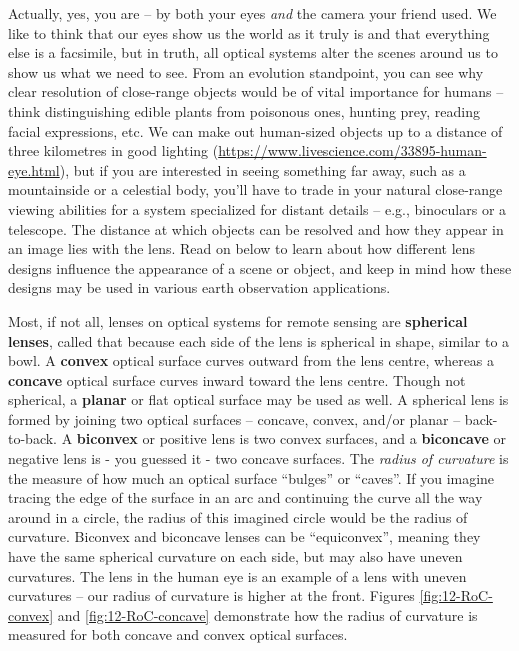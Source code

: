 \documentclass[
]{book}
\begin{document}
Actually, yes, you are -- by both your eyes \emph{and} the camera your friend used. We like to think that our eyes show us the world as it truly is and that everything else is a facsimile, but in truth, all optical systems alter the scenes around us to show us what we need to see. From an evolution standpoint, you can see why clear resolution of close-range objects would be of vital importance for humans -- think distinguishing edible plants from poisonous ones, hunting prey, reading facial expressions, etc. We can make out human-sized objects up to a distance of three kilometres in good lighting (\url{https://www.livescience.com/33895-human-eye.html}), but if you are interested in seeing something far away, such as a mountainside or a celestial body, you'll have to trade in your natural close-range viewing abilities for a system specialized for distant details -- e.g., binoculars or a telescope. The distance at which objects can be resolved and how they appear in an image lies with the lens. Read on below to learn about how different lens designs influence the appearance of a scene or object, and keep in mind how these designs may be used in various earth observation applications.

Most, if not all, lenses on optical systems for remote sensing are \textbf{spherical lenses}, called that because each side of the lens is spherical in shape, similar to a bowl. A \textbf{convex} optical surface curves outward from the lens centre, whereas a \textbf{concave} optical surface curves inward toward the lens centre. Though not spherical, a \textbf{planar} or flat optical surface may be used as well. A spherical lens is formed by joining two optical surfaces -- concave, convex, and/or planar -- back-to-back. A \textbf{biconvex} or positive lens is two convex surfaces, and a \textbf{biconcave} or negative lens is - you guessed it - two concave surfaces. The \emph{radius of curvature} is the measure of how much an optical surface ``bulges'' or ``caves''. If you imagine tracing the edge of the surface in an arc and continuing the curve all the way around in a circle, the radius of this imagined circle would be the radius of curvature. Biconvex and biconcave lenses can be ``equiconvex'', meaning they have the same spherical curvature on each side, but may also have uneven curvatures. The lens in the human eye is an example of a lens with uneven curvatures -- our radius of curvature is higher at the front. Figures \ref{fig:12-RoC-convex} and \ref{fig:12-RoC-concave} demonstrate how the radius of curvature is measured for both concave and convex optical surfaces.
\end{document}
